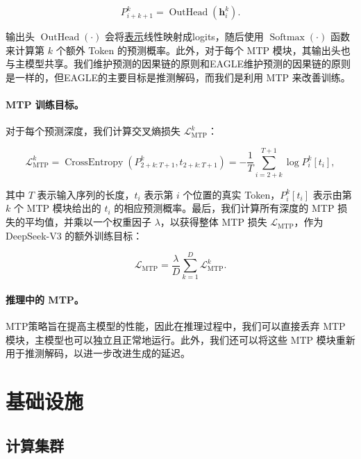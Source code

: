 \documentclass[lang=cn,a4paper,newtx]{elegantpaper}
\newcommand{\dsviii}{DeepSeek-V3}
\begin{document}
\begin{equation}
    P_{i+k+1}^{k} = \operatorname{OutHead}(\mathbf{h}_{i}^{k}).
\end{equation}

输出头 $\operatorname{OutHead}(\cdot)$ 会将\underline{表示}线性映射成logits，随后使用 $\operatorname{Softmax}(\cdot)$ 函数来计算第 $k$ 个额外 Token 的预测概率。此外，对于每个 MTP 模块，其输出头也与主模型共享。我们维护预测的因果链的原则和EAGLE维护预测的因果链的原则是一样的，但EAGLE的主要目标是推测解码，而我们是利用 MTP 来改善训练。

\paragraph{MTP 训练目标。}
对于每个预测深度，我们计算交叉熵损失 $\mathcal{L}_{\text{MTP}}^{k}$：

\begin{equation}
    \mathcal{L}_{\text{MTP}}^{k} = \operatorname{CrossEntropy}(P_{2 + k:T + 1}^{k}, t_{2 + k:T + 1}) = -\frac{1}{T} \sum_{i=2 + k}^{T + 1} \log P_i^k [t_i],
\end{equation}

其中 $T$ 表示输入序列的长度，$t_i$ 表示第 $i$ 个位置的真实 Token，$P_i^k [t_i]$ 表示由第 $k$ 个 MTP 模块给出的 $t_i$ 的相应预测概率。最后，我们计算所有深度的 MTP 损失的平均值，并乘以一个权重因子 $\lambda$，以获得整体 MTP 损失 $\mathcal{L}_{\text{MTP}}$，作为 \dsviii{} 的额外训练目标：

\begin{equation}
    \mathcal{L}_{\text{MTP}} = \frac{\lambda}{D} \sum_{k=1}^{D} \mathcal{L}_{\text{MTP}}^{k}.
\end{equation}

\paragraph{推理中的 MTP。}
MTP策略旨在提高主模型的性能，因此在推理过程中，我们可以直接丢弃 MTP 模块，主模型也可以独立且正常地运行。此外，我们还可以将这些 MTP 模块重新用于推测解码，以进一步改进生成的延迟。

\section{基础设施}
\label{sec:infra}

\subsection{计算集群}
\end{document}
